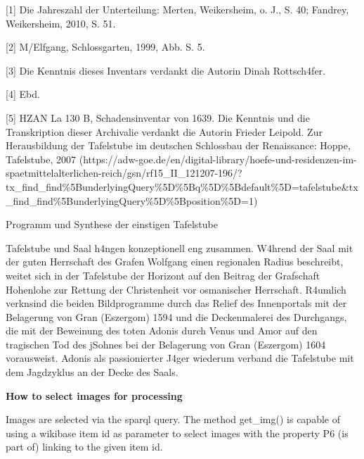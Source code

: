 \documentclass[
  a4paper,
  portrait]{book}
\begin{document}
{[}1{]} Die Jahreszahl der Unterteilung: Merten, Weikersheim, o. J., S.
40; Fandrey, Weikersheim, 2010, S. 51.

{[}2{]} M\xbcnzenmayer/Elfgang, Schlossgarten, 1999, Abb. S. 5.

{[}3{]} Die Kenntnis dieses Inventars verdankt die Autorin Dinah
Rottsch\xa4fer.

{[}4{]} Ebd.

{[}5{]} HZAN La 130 B, Schadensinventar von 1639. Die
Kenntnis und die Transkription dieser Archivalie verdankt die Autorin
Frieder Leipold. Zur Herausbildung der Tafelstube im deutschen
Schlossbau der Renaissance: Hoppe, Tafelstube, 2007
(https://adw-goe.de/en/digital-library/hoefe-und-residenzen-im-spaetmittelalterlichen-reich/gsn/rf15\_II\_121207-196/?tx\_find\_find\%5BunderlyingQuery\%5D\%5Bq\%5D\%5Bdefault\%5D=tafelstube\&tx\_find\_find\%5BunderlyingQuery\%5D\%5Bposition\%5D=1)

Programm und Synthese der einstigen Tafelstube

Tafelstube und Saal h\xa4ngen konzeptionell eng zusammen.
W\xa4hrend der Saal mit der guten Herrschaft des Grafen Wolfgang
einen regionalen Radius beschreibt, weitet sich in der Tafelstube der
Horizont auf den Beitrag der Grafschaft Hohenlohe zur Rettung der
Christenheit vor osmanischer Herrschaft. R\xa4umlich
verkn\xbcpft sind die beiden Bildprogramme durch das Relief des
Innenportals mit der Belagerung von Gran (Eszergom) 1594 und die
Deckenmalerei des Durchgangs, die mit der Beweinung des toten Adonis
durch Venus und Amor auf den tragischen Tod des j\xbcngsten Sohnes
bei der Belagerung von Gran (Eszergom) 1604 vorausweist. Adonis als
passionierter J\xa4ger wiederum verband die Tafelstube mit dem
Jagdzyklus an der Decke des Saals.

\textbf{How to select images for processing}

Images are selected via the sparql query. The method get\_img() is
capable of using a wikibase item id as parameter to select images with
the property P6 (is part of) linking to the given item id.
\end{document}
